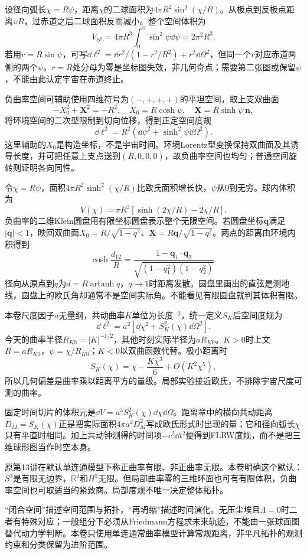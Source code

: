 设径向弧长$\chi=R\psi$，距离$\chi$的二球面积为$4\pi R^2\sin^2(\chi/R)$。从极点到反极点距离$\pi R$，过赤道之后二球面积反而减小。整个空间体积为
\[
 V_{S^3}=4\pi R^3\int_0^\pi\sin^2\psi\dd\psi=2\pi^2R^3.
\]
若用$r=R\sin\psi$，可写$\dd\ell^2=\dd r^2/(1-r^2/R^2)+r^2\dd\Omega^2$，但同一个$r$对应赤道两侧的两个$\psi$。$r=R$处分母为零是坐标图失效，非几何奇点；需要第二张图或保留$\psi$，不能由此认定宇宙在赤道终止。

负曲率空间可辅助使用四维符号为$(-,+,+,+)$的平坦空间，取上支双曲面
\[
 -X_0^2+\mathbf X^2=-R^2,\quad X_0=R\cosh\psi,\quad
 \mathbf X=R\sinh\psi\,\mathbf n,
\]
将环境空间的二次型限制到切向位移，得到正定空间度规
\[
 \dd\ell^2=R^2(\dd\psi^2+\sinh^2\psi\dd\Omega^2).
\]
这里辅助的$X_0$是构造坐标，不是宇宙时间。环境Lorentz型变换保持双曲面及其诱导长度，并可把任意上支点送到$(R,0,0,0)$，故负曲率空间也均匀；普通空间旋转则证明各向同性。

令$\chi=R\psi$，面积$4\pi R^2\sinh^2(\chi/R)$比欧氏面积增长快，$\psi$从0到无穷。球内体积为
\[
 V(\chi)=\pi R^3[\sinh(2\chi/R)-2\chi/R].
\]
负曲率的二维Klein圆盘用有限坐标圆盘表示整个无限空间。若圆盘坐标$\mathbf q$满足$|\mathbf q|<1$，映回双曲面$X_0=R/\sqrt{1-q^2}$、$\mathbf X=R\mathbf q/\sqrt{1-q^2}$。两点的距离由环境内积得到
\[
 \cosh\frac{d_{12}}R=\frac{1-\mathbf q_1\cdot\mathbf q_2}{\sqrt{(1-q_1^2)(1-q_2^2)}}.
\]
径向从原点到$q$为$d=R\operatorname{artanh}q$，$q\to1$时距离发散。圆盘里画出的直弦是测地线，圆盘上的欧氏角却通常不是空间实际角。不能看见有限圆盘就判其体积有限。

本卷尺度因子$a$无量纲，共动曲率$K$单位为长度$^{-2}$，统一定义$S_K$后空间度规为
\[
 \dd\ell^2=a^2[\dd\chi^2+S_K^2(\chi)\dd\Omega^2].
\]
今天的曲率半径$R_{K0}=|K|^{-1/2}$，其他时刻实际半径为$aR_{K0}$。$K>0$时上文$R=aR_{K0}$，$\psi=\chi/R_{K0}$；$K<0$以双曲函数代替。极小距离时
\[
 S_K(\chi)=\chi-\frac{K\chi^3}{6}+O(K^2\chi^5),
\]
所以几何偏差是曲率乘以距离平方的量级。局部实验接近欧氏，不排除宇宙尺度可测的曲率。

固定时间切片的体积元是$\dd V=a^3S_K^2(\chi)\dd\chi\dd\Omega$。距离章中的横向共动距离$D_M=S_K(\chi)$正是把实际面积$4\pi a^2D_M^2$写成欧氏形式时出现的量；它和径向弧长$\chi$只有平直时相同。加上共动钟测得的时间项$-c^2\dd t^2$便得到FLRW度规，而不是把三维球形图当作时空本身。

原第13讲在默认单连通模型下称正曲率有限、非正曲率无限。本卷明确这个默认：$S^3$是有限无边界，$\mathbb R^3$和$H^3$无限。但局部曲率零的三维环面也可有有限体积，负曲率空间也可取适当的紧致商。局部度规不唯一决定整体拓扑。

“闭合空间”描述空间范围与拓扑，“再坍缩”描述时间演化。无压尘埃且$\Lambda=0$时二者有特殊对应；一般组分下必须从Friedmann方程求未来轨迹，不能由一张球面图替代动力学判断。本卷只使用单连通常曲率模型计算常规距离，非平凡拓扑的观测约束和分类保留为进阶范围。
